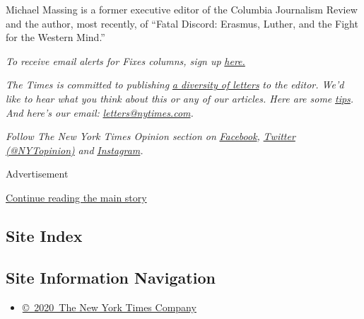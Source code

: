 Michael Massing is a former executive editor of the Columbia Journalism
Review and the author, most recently, of ``Fatal Discord: Erasmus,
Luther, and the Fight for the Western Mind.''

\emph{To receive email alerts for Fixes columns, sign up}
\href{http://eepurl.com/ABIxL}{\emph{here.}}

\emph{The Times is committed to publishing}
\href{https://www.nytimes.com/2019/01/31/opinion/letters/letters-to-editor-new-york-times-women.html}{\emph{a
diversity of letters}} \emph{to the editor. We'd like to hear what you
think about this or any of our articles. Here are some}
\href{https://help.nytimes.com/hc/en-us/articles/115014925288-How-to-submit-a-letter-to-the-editor}{\emph{tips}}\emph{.
And here's our email:}
\href{mailto:letters@nytimes.com}{\emph{letters@nytimes.com}}\emph{.}

\emph{Follow The New York Times Opinion section on}
\href{https://www.facebook.com/nytopinion}{\emph{Facebook}}\emph{,}
\href{http://twitter.com/NYTOpinion}{\emph{Twitter (@NYTopinion)}}
\emph{and}
\href{https://www.instagram.com/nytopinion/}{\emph{Instagram}}\emph{.}

Advertisement

\protect\hyperlink{after-bottom}{Continue reading the main story}

\hypertarget{site-index}{%
\subsection{Site Index}\label{site-index}}

\hypertarget{site-information-navigation}{%
\subsection{Site Information
Navigation}\label{site-information-navigation}}

\begin{itemize}
\tightlist
\item
  \href{https://help.nytimes.com/hc/en-us/articles/115014792127-Copyright-notice}{©~2020~The
  New York Times Company}
\end{itemize}

